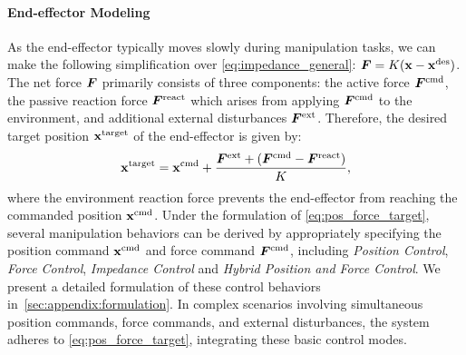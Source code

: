 \documentclass{article}
\begin{document}



\paragraph{End-effector Modeling} As the end-effector typically moves slowly during manipulation tasks, we can make the following simplification over \cref{eq:impedance_general}:
\({\bm{F}} = K({\mathbf{x}} - {\mathbf{x}}^{\text{des}})\).
The net force ${\bm{F}}$ primarily consists of three components: the active force ${\bm{F}}^{\text{cmd}}$, the passive reaction force ${\bm{F}}^{\text{react}}$ which arises from applying ${\bm{F}}^{\text{cmd}}$ to the environment, and additional external disturbances ${\bm{F}}^{\text{ext}}$. Therefore, the desired target position ${\mathbf{x}}^{\text{target}}$ of the end-effector is given by:
\begin{equation}
{\mathbf{x}}^{\text{target}} = {\mathbf{x}}^{\text{cmd}} + \frac{{\bm{F}}^{\text{ext}} + ({\bm{F}}^{\text{cmd}} - {\bm{F}}^{\text{react}})}{K},
\label{eq:pos_force_target}
\end{equation}
where the environment reaction force prevents the end-effector from reaching the commanded position ${\mathbf{x}}^{\text{cmd}}$. Under the formulation of \cref{eq:pos_force_target}, several manipulation behaviors can be derived by appropriately specifying the position command ${\mathbf{x}}^{\text{cmd}}$ and force command ${\bm{F}}^{\text{cmd}}$, including \textit{Position Control}, \textit{Force Control}, \textit{Impedance Control} and \textit{Hybrid Position and Force Control}. We present a detailed formulation of these control behaviors in~\cref{sec:appendix:formulation}. In complex scenarios involving simultaneous position commands, force commands, and external disturbances, the system adheres to \cref{eq:pos_force_target}, integrating these basic control modes.
\end{document}
